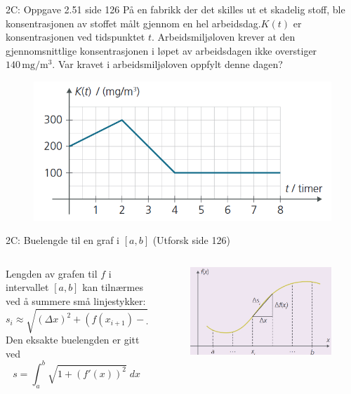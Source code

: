 \greenheader
\begin{frame}{2C: Oppgave 2.51 side 126}
    På en fabrikk der det skilles ut et skadelig stoff, ble konsentrasjonen av stoffet målt gjennom en hel arbeidsdag.\(K(t)\) er konsentrasjonen ved tidspunktet \(t\). Arbeidsmiljøloven krever at den gjennomsnittlige konsentrasjonen i løpet av arbeidsdagen ikke overstiger \(140\,\mathrm{mg}/\mathrm{m}^3\). Var kravet i arbeidsmiljøloven oppfylt denne dagen?

\begin{figure}
    \centering
    \includegraphics[width=0.6\linewidth]{R2-K2B-13.png}
\end{figure}
\end{frame}

\magentaheader
\begin{frame}{2C: Buelengde til en graf i \([a, b]\) (Utforsk side 126)}
    \begin{columns}
        \begin{column}{0.40\linewidth}
            Lengden av grafen til \(f\) i intervallet \([a, b]\) kan tilnærmes ved å summere små linjestykker:
            \[
            s_i \approx \sqrt{(\Delta x)^2 + (f(x_{i+1}) - f(x_i))^2}
            \]
            Den eksakte buelengden er gitt ved
            \[
            s = \int_a^b \sqrt{1 + (f'(x))^2} \; dx
            \]
        \end{column}
        \begin{column}{0.60\linewidth}
            \begin{figure}
                \centering
                \includegraphics[width=\linewidth]{R2-K2C-8.png}
            \end{figure}
        \end{column}
    \end{columns}
\end{frame}


